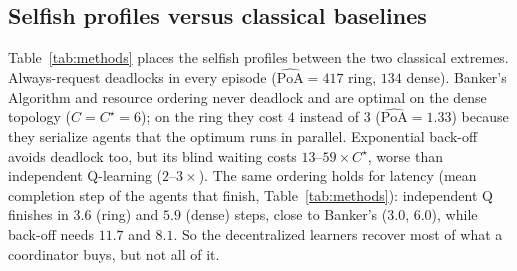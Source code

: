 \documentclass[10pt]{article}
\newcommand{\PoAhat}{\widehat{\mathrm{PoA}}}
\begin{document}
\begin{table}[t]
\centering\small
\caption{All profiles at $\rho=0$, averaged over $R/K$, $D$ and $I$. $\pm$: mean 95\% CI over seeds (stochastic
methods only). Latency: mean completion step of agents that finish. Seeds per cell; ``--'': not applicable (the
baselines are not equilibrium concepts).}
\label{tab:methods}

\end{table}

\subsection{Selfish profiles versus classical baselines}
Table~\ref{tab:methods} places the selfish profiles between the two classical extremes. Always-request deadlocks in
every episode ($\PoAhat=417$ ring, $134$ dense). Banker's Algorithm and resource ordering never deadlock and are optimal on
the dense topology ($C=C^\star=6$); on the ring they cost $4$ instead of $3$ ($\PoAhat=1.33$) because they serialize
agents that the optimum runs in parallel. Exponential back-off avoids deadlock too, but its blind waiting costs
$13$--$59\times C^\star$, worse than independent Q-learning ($2$--$3\times$). The same ordering holds for latency (mean completion step of
the agents that finish, Table~\ref{tab:methods}): independent Q finishes in $3.6$ (ring) and $5.9$ (dense) steps,
close to Banker's ($3.0$, $6.0$), while back-off needs $11.7$ and $8.1$. So the decentralized learners recover most of
what a coordinator buys, but not all of it.
\end{document}

